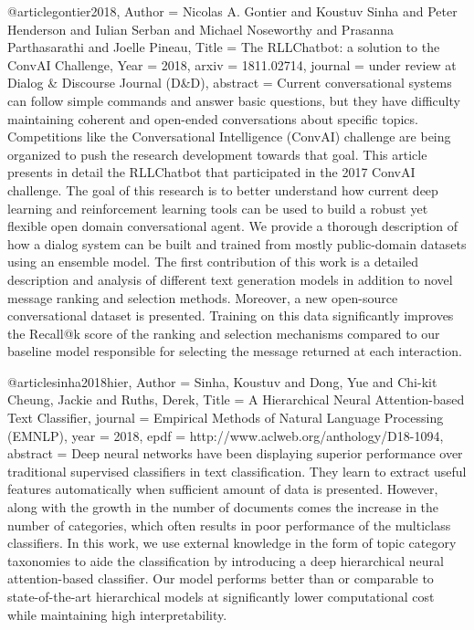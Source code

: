 @article{gontier2018,
  Author = {Nicolas A. Gontier and Koustuv Sinha and Peter Henderson and Iulian Serban and Michael Noseworthy and Prasanna Parthasarathi and Joelle Pineau},
  Title = {The RLLChatbot: a solution to the ConvAI Challenge},
  Year = {2018},
  arxiv = {1811.02714},
  journal = {under review at Dialog & Discourse Journal (D&D)},
  abstract = {Current conversational systems can follow simple commands and answer basic questions, but they have difficulty maintaining coherent and open-ended conversations about specific topics. Competitions like the Conversational Intelligence (ConvAI) challenge are being organized to push the research development towards that goal. This article presents in detail the RLLChatbot that participated in the 2017 ConvAI challenge. The goal of this research is to better understand how current deep learning and reinforcement learning tools can be used to build a robust yet flexible open domain conversational agent. We provide a thorough description of how a dialog system can be built and trained from mostly public-domain datasets using an ensemble model. The first contribution of this work is a detailed description and analysis of different text generation models in addition to novel message ranking and selection methods. Moreover, a new open-source conversational dataset is presented. Training on this data significantly improves the Recall@k score of the ranking and selection mechanisms compared to our baseline model responsible for selecting the message returned at each interaction. }
}

@article{sinha2018hier,
  Author = {{Sinha}, Koustuv and {Dong}, Yue and {Chi-kit Cheung}, Jackie and {Ruths}, Derek},
  Title = {A Hierarchical Neural Attention-based Text Classifier},
  journal = {Empirical Methods of Natural Language Processing (EMNLP)},
  year = {2018},
  epdf = {http://www.aclweb.org/anthology/D18-1094},
  abstract = {Deep neural networks have been displaying superior  performance over traditional supervised classifiers in text classification. They learn to extract useful features automatically when sufficient amount of data is presented. However, along with the growth in the number of documents comes the increase in the number of categories, which often results in poor performance of the multiclass classifiers. In this work, we use external knowledge in the form of topic category taxonomies to aide the classification by introducing a deep hierarchical neural attention-based classifier.  Our model performs better than or comparable to state-of-the-art hierarchical models at significantly lower computational cost while maintaining high interpretability.}
}

